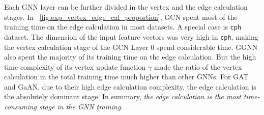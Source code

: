 Each GNN layer can be further divided in the vertex and the edge calculation stages.
In \figurename~\ref{fig:exp_vertex_edge_cal_proportion}, GCN spent most of the training time on the edge calculation in most datasets.
A special case is \texttt{cph} dataset.
The dimension of the input feature vectors was very high in \texttt{cph}, making the vertex calculation stage of the GCN Layer 0 spend considerable time.
GGNN also spent the majority of its training time on the edge calculation.
But the high time complexity of its vertex update function $\gamma$ made the ratio of the vertex calculation in the total training time much higher than other GNNs.
For GAT and GaAN, due to their high edge calculation complexity, the edge calculation is the absolutely dominant stage.
In summary, \emph{the edge calculation is the most time-consuming stage in the GNN training}.

